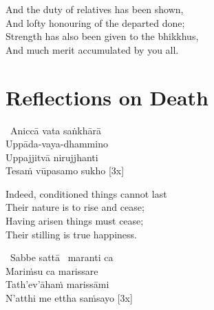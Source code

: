 \begin{english-verses}
  And the duty of relatives has been shown,\\
  And lofty honouring of the departed done;\\
  Strength has also been given to the bhikkhus,\\
  And much merit accumulated by you all.
\end{english-verses}

\suttaRef{[Kp 7]}



\section{Reflections on Death}
\label{reflections-on-death}

\begin{pali-hang-together}
  \anglebracketleft\ \hspace{-0.5mm}Aniccā vata saṅkhārā \hspace{-0.5mm}\anglebracketright\ \\
  Uppāda-vaya-dhammino\\
  Uppajjitvā nirujjhanti\\
  Tesaṁ vūpasamo sukho \hfill{[3x]}
\end{pali-hang-together}

\begin{english-verses}
  Indeed, conditioned things cannot last\\
  Their nature is to rise and cease;\ifdigital\makeatletter\hyperlink{endnote132-appendix}\makeatother\fi\\
  Having arisen things must cease;\\
  Their stilling is true happiness.
\end{english-verses}

\ifafive\vspace{-0.5em}\fi

\suttaRef{[DN 16]}

\begin{pali-hang-continued}
  \anglebracketleft\ \hspace{-0.5mm}Sabbe sattā \hspace{-0.5mm}\anglebracketright\ maranti ca\\
  Mariṁsu ca marissare\\
  Tath'ev'āhaṁ marissāmi\\
  N'atthi me ettha saṁsayo \hfill{[3x]}
\end{pali-hang-continued}

